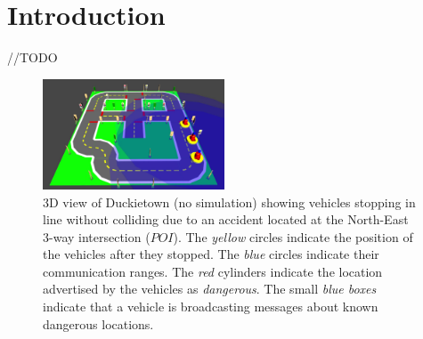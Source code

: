 \section{Introduction}

//TODO

\begin{figure}[t]
    \centering
    \includegraphics[width=0.48\textwidth]{figures/full-model_viewer.jpg}
    \caption{3D view of Duckietown (no simulation) showing vehicles stopping in line without colliding
    due to an accident located at the North-East 3-way intersection ($POI$).
    The \textit{yellow} circles indicate the position of the vehicles after they stopped. 
    The \textit{blue} circles indicate their communication ranges. The \textit{red} cylinders 
    indicate the location advertised by the vehicles as \textit{dangerous}. The small \textit{blue boxes} 
    indicate that a vehicle is broadcasting messages about known dangerous locations.  \label{fig:3d_viewer_full_model}}
\end{figure}


